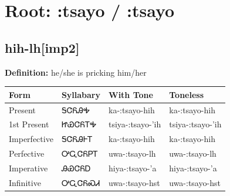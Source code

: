 \documentclass{article}%
\begin{document}
%
\normalsize%
\section*{Root: :tsayo / :tsayo}%
\subsection*{hih-lh[imp2]}%
\textbf{Definition: }%
he/she is pricking him/her%
\\[0.5em]%
\begin{tabular}{|l|l|l|l|}%
\hline%
\textbf{Form}&\textbf{Syllabary}&\textbf{With Tone}&\textbf{Toneless}\\%
\hline%
Present&ᎦᏣᏲᎯᎭ&ka{-}:tsayo{-}hih&ka{-}:tsayo{-}hih\\%
1st Present&ᏥᏯᏣᏲᎢᎭ&tsiya{-}:tsayo{-}'ih&tsiya{-}:tsayo{-}'ih\\%
Imperfective&ᎦᏣᏲᎯᎰᎢ&ka{-}:tsayo{-}hih&ka{-}:tsayo{-}hih\\%
Perfective&ᎤᏩᏣᏲᏢᎢ&uwa{-}:tsayo{-}lh&uwa{-}:tsayo{-}lh\\%
Imperative&ᎯᏯᏣᏲᎠ&hiya{-}:tsayo{-}'a&hiya{-}:tsayo{-}'a\\%
Infinitive&ᎤᏩᏣᏲᏍᏗ&uwa{-}:tsayo{-}hst&uwa{-}:tsayo{-}hst\\%
\hline%
\end{tabular}%
\\[1em]%
\end{document}
